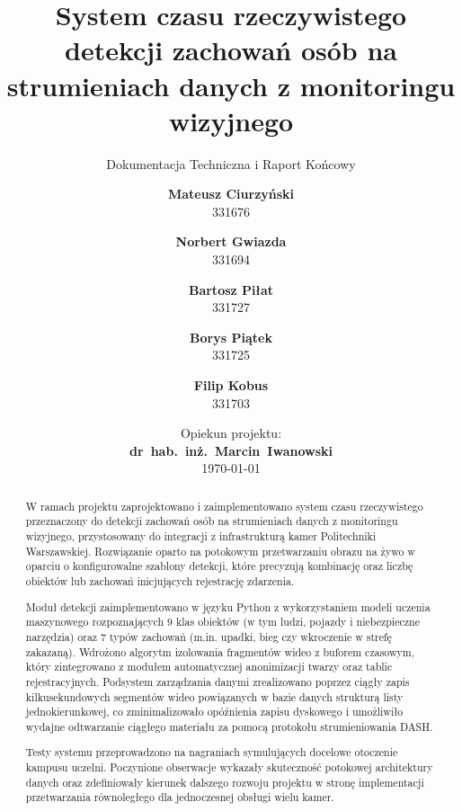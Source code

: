 \documentclass[
    fontsize=12pt,
    paper=a4,
    oneside,              %
    titlepage=true,             %
    headinclude=true,           %
    footinclude=false,          %
    BCOR=5mm,                   %
    DIV=11,                     %
    parskip=half,               %
    numbers=endperiod,           %
    listof=totoc,               %
    index=totoc,                 %
    bibliography=totoc,          %
    abstract=on,
]{scrreprt}
\title{System czasu rzeczywistego detekcji zachowań osób na strumieniach danych z monitoringu wizyjnego}
\subtitle{Dokumentacja Techniczna i Raport Końcowy}
\author{
\textbf{Mateusz Ciurzyński} \\ 331676
\and \textbf{Norbert Gwiazda} \\ 331694
\and \textbf{Bartosz Piłat} \\ 331727
\and \textbf{Borys Piątek} \\ 331725
\and \textbf{Filip Kobus} \\ 331703
}
\date{
    \vspace{20mm}
    {\large Opiekun projektu:}\\[0.5em]
    {\large\bfseries dr\ hab.\ inż.\ Marcin\ Iwanowski}\\[4pt]
    \vfill
    \today
}
\begin{document}
\maketitle

\begin{abstract}
W ramach projektu zaprojektowano i zaimplementowano system czasu rzeczywistego przeznaczony do detekcji zachowań osób na strumieniach danych z monitoringu wizyjnego, przystosowany do integracji z infrastrukturą kamer Politechniki Warszawskiej. Rozwiązanie oparto na potokowym przetwarzaniu obrazu na żywo w oparciu o konfigurowalne szablony detekcji, które precyzują kombinację oraz liczbę obiektów lub zachowań inicjujących rejestrację zdarzenia. 

Moduł detekcji zaimplementowano w języku Python z wykorzystaniem modeli uczenia maszynowego rozpoznających 9 klas obiektów (w tym ludzi, pojazdy i niebezpieczne narzędzia) oraz 7 typów zachowań (m.in. upadki, bieg czy wkroczenie w strefę zakazaną). Wdrożono algorytm izolowania fragmentów wideo z buforem czasowym, który zintegrowano z modułem automatycznej anonimizacji twarzy oraz tablic rejestracyjnych. Podsystem zarządzania danymi zrealizowano poprzez ciągły zapis kilkusekundowych segmentów wideo powiązanych w bazie danych strukturą listy jednokierunkowej, co zminimalizowało opóźnienia zapisu dyskowego i umożliwiło wydajne odtwarzanie ciągłego materiału za pomocą protokołu strumieniowania DASH. 

Testy systemu przeprowadzono na nagraniach symulujących docelowe otoczenie kampusu uczelni. Poczynione obserwacje wykazały skuteczność potokowej architektury danych oraz zdefiniowały kierunek dalszego rozwoju projektu w stronę implementacji przetwarzania równoległego dla jednoczesnej obsługi wielu kamer.
\end{abstract}

\clearpage
\tableofcontents                
\clearpage













\printbibliography
\end{document}
